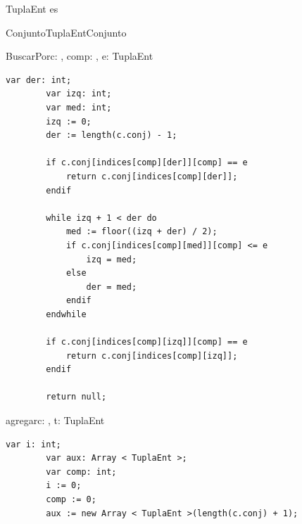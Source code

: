 TuplaEnt es \tupla{\Int,\Int,\Int}
\begin{module}{Conjunto}{TuplaEnt}{Conjunto}{\tupla{\ent,\ent,\ent}}





	\pagebreak

	\begin{proc}{BuscarPor}{\In c: \moduletype, \In comp: \Int, \In e: \Int}{TuplaEnt}
		\begin{lstlisting}[numbers=none,frame=none]
		var der: int;
		var izq: int;
		var med: int;
		izq := 0;
		der := length(c.conj) - 1;

		if c.conj[indices[comp][der]][comp] == e
			return c.conj[indices[comp][der]];
		endif

		while izq + 1 < der do
			med := floor((izq + der) / 2);
			if c.conj[indices[comp][med]][comp] <= e
				izq = med;
			else
				der = med;
			endif
		endwhile

		if c.conj[indices[comp][izq]][comp] == e
			return c.conj[indices[comp][izq]];
		endif

		return null;
		\end{lstlisting}
	\end{proc}

	\begin{proc}{agregar}{\Inout c: \moduletype, \In t: TuplaEnt}{}
		\begin{lstlisting}[numbers=none,frame=none]
		var i: int;
		var aux: Array < TuplaEnt >;
		var comp: int;
		i := 0;
		comp := 0;
		aux := new Array < TuplaEnt >(length(c.conj) + 1);


\end{lstlisting}
\end{proc}
\end{module}
